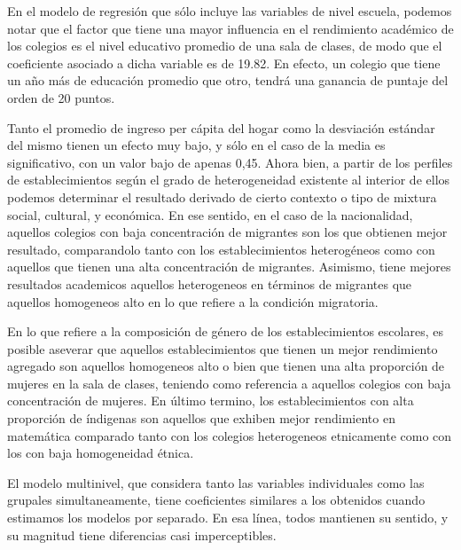 \documentclass[
]{article}
\begin{document}
En el modelo de regresión que sólo incluye las variables de nivel
escuela, podemos notar que el factor que tiene una mayor influencia en
el rendimiento académico de los colegios es el nivel educativo promedio
de una sala de clases, de modo que el coeficiente asociado a dicha
variable es de 19.82. En efecto, un colegio que tiene un año más de
educación promedio que otro, tendrá una ganancia de puntaje del orden de
20 puntos.

Tanto el promedio de ingreso per cápita del hogar como la desviación
estándar del mismo tienen un efecto muy bajo, y sólo en el caso de la
media es significativo, con un valor bajo de apenas 0,45. Ahora bien, a
partir de los perfiles de establecimientos según el grado de
heterogeneidad existente al interior de ellos podemos determinar el
resultado derivado de cierto contexto o tipo de mixtura social,
cultural, y económica. En ese sentido, en el caso de la nacionalidad,
aquellos colegios con baja concentración de migrantes son los que
obtienen mejor resultado, comparandolo tanto con los establecimientos
heterogéneos como con aquellos que tienen una alta concentración de
migrantes. Asimismo, tiene mejores resultados academicos aquellos
heterogeneos en términos de migrantes que aquellos homogeneos alto en lo
que refiere a la condición migratoria.

En lo que refiere a la composición de género de los establecimientos
escolares, es posible aseverar que aquellos establecimientos que tienen
un mejor rendimiento agregado son aquellos homogeneos alto o bien que
tienen una alta proporción de mujeres en la sala de clases, teniendo
como referencia a aquellos colegios con baja concentración de mujeres.
En último termino, los establecimientos con alta proporción de índigenas
son aquellos que exhiben mejor rendimiento en matemática comparado tanto
con los colegios heterogeneos etnicamente como con los con baja
homogeneidad étnica.

El modelo multinivel, que considera tanto las variables individuales
como las grupales simultaneamente, tiene coeficientes similares a los
obtenidos cuando estimamos los modelos por separado. En esa línea, todos
mantienen su sentido, y su magnitud tiene diferencias casi
imperceptibles.
\end{document}
